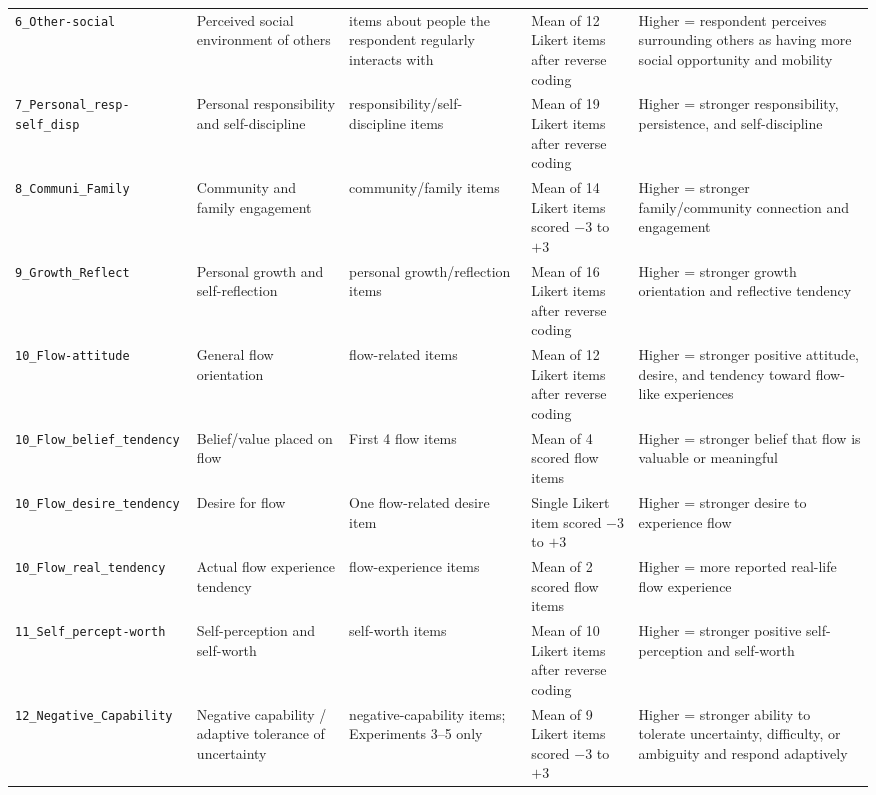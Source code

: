 \begin{longtable}{>{\raggedright\arraybackslash}p{3.6cm}>{\raggedright\arraybackslash}p{2.4cm}>{\raggedright\arraybackslash}p{2.7cm}>{\raggedright\arraybackslash}p{2.5cm}>{\raggedright\arraybackslash}p{3.4cm}}
\texttt{6\_Other-social} & Perceived social environment of others & 12 items about people the respondent regularly interacts with & Mean of 12 Likert items after reverse coding & Higher = respondent perceives surrounding others as having more social opportunity and mobility \\
\texttt{7\_Personal\_resp-}\newline\texttt{self\_disp} & Personal responsibility and self-discipline & 19 responsibility/self-discipline items & Mean of 19 Likert items after reverse coding & Higher = stronger responsibility, persistence, and self-discipline \\
\texttt{8\_Communi\_Family} & Community and family engagement & 14 community/family items & Mean of 14 Likert items scored $-$3 to $+$3 & Higher = stronger family/community connection and engagement \\
\texttt{9\_Growth\_Reflect} & Personal growth and self-reflection & 16 personal growth/reflection items & Mean of 16 Likert items after reverse coding & Higher = stronger growth orientation and reflective tendency \\
\texttt{10\_Flow-attitude} & General flow orientation & 12 flow-related items & Mean of 12 Likert items after reverse coding & Higher = stronger positive attitude, desire, and tendency toward flow-like experiences \\
\texttt{10\_Flow\_belief\_tendency} & Belief/value placed on flow & First 4 flow items & Mean of 4 scored flow items & Higher = stronger belief that flow is valuable or meaningful \\
\texttt{10\_Flow\_desire\_tendency} & Desire for flow & One flow-related desire item & Single Likert item scored $-$3 to $+$3 & Higher = stronger desire to experience flow \\
\texttt{10\_Flow\_real\_tendency} & Actual flow experience tendency & 2 flow-experience items & Mean of 2 scored flow items & Higher = more reported real-life flow experience \\
\texttt{11\_Self\_percept-worth} & Self-perception and self-worth & 10 self-worth items & Mean of 10 Likert items after reverse coding & Higher = stronger positive self-perception and self-worth \\
\texttt{12\_Negative\_Capability} & Negative capability / adaptive tolerance of uncertainty & 9 negative-capability items; Experiments 3--5 only & Mean of 9 Likert items scored $-$3 to $+$3 & Higher = stronger ability to tolerate uncertainty, difficulty, or ambiguity and respond adaptively \\

\end{longtable}
